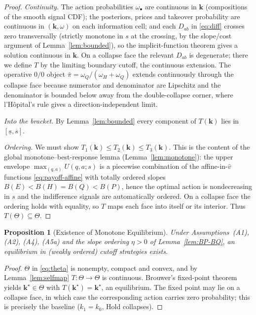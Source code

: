 \documentclass[11pt]{article}
\newtheorem{proposition}{Proposition}
\newcommand{\1}{\mathbf{1}}
\providecommand{\kvec}{\mathbf{k}}
\providecommand{\kone}{k_1}
\providecommand{\kzero}{k_0}
\providecommand{\Tmap}{T}
\providecommand{\vhat}{\hat{v}}
\providecommand{\pibar}{\bar{\pi}}
\providecommand{\omegaH}{\omega_H}
\providecommand{\omegaQ}{\omega_Q}
\begin{document}
\begin{proof}
\emph{Continuity.} The action probabilities $\omega_\bullet$ are continuous in $\kvec$ (compositions of the smooth signal CDF); the posteriors, prices and takeover probability are continuous in $(\kvec,\omega)$ on each information cell; and each $D_{ab}$ in \eqref{eq:diff} crosses zero transversally (strictly monotone in $s$ at the crossing, by the slope/cost argument of Lemma~\ref{lem:bounded}), so the implicit-function theorem gives a solution continuous in $\kvec$. On a collapse face the relevant $D_{ab}$ is degenerate; there we define $\Tmap$ by the limiting boundary cutoff, the continuous extension. The operative $0/0$ object $\pibar=\omegaQ/(\omegaH+\omegaQ)$ extends continuously through the collapse face because numerator and denominator are Lipschitz and the denominator is bounded below away from the double-collapse corner, where l'H\^opital's rule gives a direction-independent limit.

\emph{Into the bracket.} By Lemma~\ref{lem:bounded} every component of $\Tmap(\kvec)$ lies in $[\underline{s},\overline{s}]$.

\emph{Ordering.} We must show $\Tmap_1(\kvec)\le\Tmap_2(\kvec)\le\Tmap_3(\kvec)$. This is the content of the global monotone--best-response lemma (Lemma~\ref{lem:monotone}): the upper envelope $\max_{(q,a)}U(q,a;s)$ is a piecewise combination of the affine-in-$\vhat$ functions \eqref{eq:payoff-affine} with totally ordered slopes $B(E)<B(H)=B(Q)<B(P)$, hence the optimal action is nondecreasing in $s$ and the indifference signals are automatically ordered. On a collapse face the ordering holds with equality, so $\Tmap$ maps each face into itself or its interior. Thus $\Tmap(\Theta)\subseteq\Theta$.
\end{proof}

\begin{proposition}[Existence of Monotone Equilibrium]
\label{prop:existence}
Under Assumptions~\textup{(A1)}, \textup{(A2)}, \textup{(A4)}, \textup{(A5a)} and the slope ordering $\eta>0$ of Lemma~\ref{lem:BP-BQ}, an equilibrium in (weakly ordered) cutoff strategies exists.
\end{proposition}

\begin{proof}
$\Theta$ in \eqref{eq:theta} is nonempty, compact and convex, and by Lemma~\ref{lem:selfmap} $\Tmap:\Theta\to\Theta$ is continuous. Brouwer's fixed-point theorem yields $\kvec^\star\in\Theta$ with $\Tmap(\kvec^\star)=\kvec^\star$, an equilibrium. The fixed point may lie on a collapse face, in which case the corresponding action carries zero probability; this is precisely the baseline ($\kone=\kzero$, Hold collapses).
\end{proof}
\end{document}
